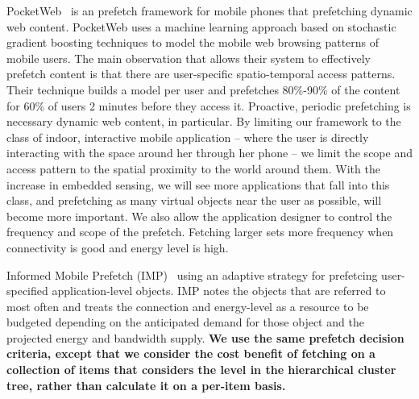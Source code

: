 PocketWeb~\cite{pocketweb} is an prefetch framework for mobile phones that prefetching dynamic web content.
PocketWeb uses a machine learning approach based on stochastic gradient boosting techniques to model 
the mobile web browsing patterns of mobile users.  The main observation that allows their system to effectively
prefetch content is that there are user-specific spatio-temporal access patterns.  Their technique builds a model
per user and prefetches 80\%-90\% of the content for 60\% of users 2 minutes before they access it.  Proactive, periodic
prefetching is necessary dynamic web content, in particular.  By limiting our framework to the class of indoor, interactive
mobile application -- where the user is directly interacting with the space around her through her phone -- 
we limit the scope and access pattern to the spatial proximity to the world around them.
With the increase in embedded sensing, we will see more applications that fall into this class, and prefetching as many virtual
objects near the user as possible, will become more important.  We also allow the application designer
to control the frequency and scope of the prefetch.  Fetching larger sets more frequency when connectivity is good and
energy level is high.


%	
Informed Mobile Prefetch (IMP)~\cite{imp_mobisys2012} using an adaptive strategy for prefetcing user-specified application-level objects.
IMP notes the objects that are referred to most often and treats the connection and energy-level as a resource to be budgeted
depending on the anticipated demand for those object and the projected energy and bandwidth supply.
{\bf We use the same prefetch decision criteria, except that we consider the cost benefit of fetching on a collection of items
that considers the level in the hierarchical cluster tree, rather than calculate it on a per-item basis.}







